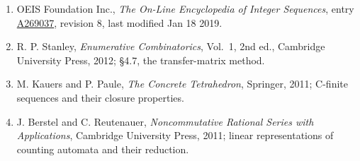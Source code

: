 \documentclass[11pt]{article}
\theoremstyle{definition}
\begin{document}
\begin{enumerate}

\item OEIS Foundation Inc., \emph{The On-Line Encyclopedia of Integer Sequences}, entry \href{https://oeis.org/A269037}{A269037}, revision 8, last modified Jan 18 2019.

\item R. P. Stanley, \emph{Enumerative Combinatorics}, Vol.~1, 2nd ed., Cambridge University Press, 2012; \S4.7, the transfer-matrix method.

\item M. Kauers and P. Paule, \emph{The Concrete Tetrahedron}, Springer, 2011; C-finite sequences and their closure properties.

\item J. Berstel and C. Reutenauer, \emph{Noncommutative Rational Series with Applications}, Cambridge University Press, 2011; linear representations of counting automata and their reduction.

\end{enumerate}
\end{document}
